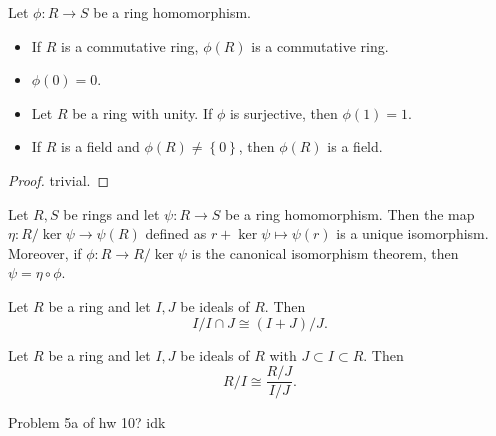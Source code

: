 \begin{theorem}[Properties]\label{thm:ka}
	Let $\phi : R \to S$ be a ring homomorphism.
	\begin{itemize}
		\item If $R$ is a commutative ring, $\phi (R)$ is a commutative ring.
		\item $\phi (0)=0$.
		\item Let $R$ be a ring with unity. If $\phi $ is surjective, then $\phi (1)=1$.
		\item If $R$ is a field and $\phi (R)\neq \left\{ 0 \right\}  $, then $\phi (R)$ is a field.
	\end{itemize}
\end{theorem}
\begin{proof}
	trivial.
\end{proof}
\begin{theorem}\label{thm:FIT}
	Let $R,S$ be rings and let $\psi  : R \to S$ be a ring homomorphism. Then the map  $\eta  : R /\ker \psi   \to \psi  (R) $ defined as $r+\ker \psi  \mapsto \psi  (r)$ is a unique isomorphism. Moreover, if $\phi : R \to R /\ker \psi $ is the canonical isomorphism theorem, then $\psi =\eta \circ \phi $.
\end{theorem}
\begin{theorem}\label{thm:SIT}
	Let $R$ be a ring and let $I,J$ be ideals of $R$. Then
	\[
		I /I\cap J \cong (I+J) /J
	.\]
\end{theorem}
\begin{theorem}\label{thm:FIT}
	Let $R$ be a ring and let $I,J$ be ideals of $R$ with $J \subset I \subset R$. Then
	\[
		R /I \cong \frac{R /J}{I /J}
	.\]
\end{theorem}
\begin{theorem}\label{thm:FOIT}
	Problem 5a of hw 10? idk
\end{theorem}
